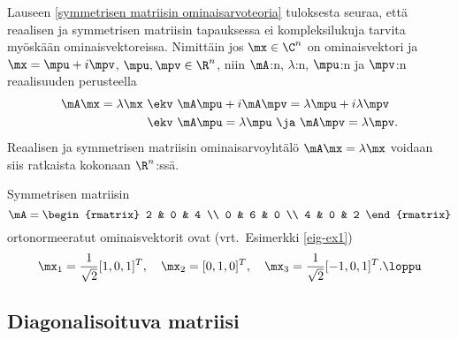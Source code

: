 Lauseen \ref{symmetrisen matriisin ominaisarvoteoria} tuloksesta seuraa, että reaalisen ja 
symmetrisen matriisin tapauksessa ei kompleksilukuja tarvita myöskään ominaisvektoreissa. 
Nimittäin jos $\mx\in\C^n$ on ominaisvektori ja $\mx=\mpu+i\mpv$, $\mpu,\mpv\in\R^n$, niin 
$\mA$:n, $\lambda$:n, $\mpu$:n ja $\mpv$:n reaalisuuden perusteella
\begin{align*}
\mA\mx=\lambda\mx \ &\ekv \ \mA\mpu+i\mA\mpv=\lambda\mpu+i\lambda\mpv \\
&\ekv \ \mA\mpu=\lambda\mpu \ \ja \ \mA\mpv=\lambda\mpv.
\end{align*}
Reaalisen ja symmetrisen matriisin ominaisarvoyhtälö $\mA\mx=\lambda\mx$ voidaan siis ratkaista
kokonaan $\R^n$:ssä.
\begin{Exa} \label{eig-ex5} Symmetrisen matriisin
\[
\mA=\begin{rmatrix} 2 & 0 & 4 \\ 0 & 6 & 0 \\ 4 & 0 & 2 \end{rmatrix}
\]
ortonormeeratut ominaisvektorit ovat (vrt.\ Esimerkki \ref{eig-ex1})
\[
\mx_1=\frac{1}{\sqrt{2}}[1,0,1]^T, \quad 
\mx_2=[0,1,0]^T, \quad 
\mx_3=\frac{1}{\sqrt{2}}[-1,0,1]^T. \loppu
\]
\end{Exa}

\subsection{Diagonalisoituva matriisi}

